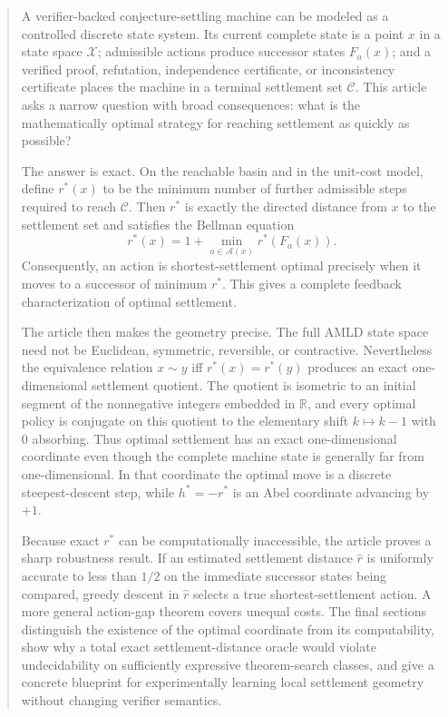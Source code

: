 \documentclass[11pt,letterpaper]{article}
\theoremstyle{remark}
\newcommand{\X}{\mathcal X}
\newcommand{\Cset}{\mathcal C}
\newcommand{\A}{\mathcal A}
\newcommand{\R}{\mathbb R}
\newcommand{\rstar}{r^{\!*}}
\newcommand{\rhat}{\widehat r}
\begin{document}
\begin{abstract}
A verifier-backed conjecture-settling machine can be modeled as a controlled discrete state system. Its current complete state is a point $x$ in a state space $\X$; admissible actions produce successor states $F_a(x)$; and a verified proof, refutation, independence certificate, or inconsistency certificate places the machine in a terminal settlement set $\Cset$. This article asks a narrow question with broad consequences: what is the mathematically optimal strategy for reaching settlement as quickly as possible?

The answer is exact. On the reachable basin and in the unit-cost model, define $\rstar(x)$ to be the minimum number of further admissible steps required to reach $\Cset$. Then $\rstar$ is exactly the directed distance from $x$ to the settlement set and satisfies the Bellman equation
\[
\rstar(x)=1+\min_{a\in\A(x)}\rstar(F_a(x)).
\]
Consequently, an action is shortest-settlement optimal precisely when it moves to a successor of minimum $\rstar$. This gives a complete feedback characterization of optimal settlement.

The article then makes the geometry precise. The full AMLD state space need not be Euclidean, symmetric, reversible, or contractive. Nevertheless the equivalence relation $x\sim y$ iff $\rstar(x)=\rstar(y)$ produces an exact one-dimensional settlement quotient. The quotient is isometric to an initial segment of the nonnegative integers embedded in $\R$, and every optimal policy is conjugate on this quotient to the elementary shift $k\mapsto k-1$ with $0$ absorbing. Thus optimal settlement has an exact one-dimensional coordinate even though the complete machine state is generally far from one-dimensional. In that coordinate the optimal move is a discrete steepest-descent step, while $h^*=-\rstar$ is an Abel coordinate advancing by $+1$.

Because exact $\rstar$ can be computationally inaccessible, the article proves a sharp robustness result. If an estimated settlement distance $\rhat$ is uniformly accurate to less than $1/2$ on the immediate successor states being compared, greedy descent in $\rhat$ selects a true shortest-settlement action. A more general action-gap theorem covers unequal costs. The final sections distinguish the existence of the optimal coordinate from its computability, show why a total exact settlement-distance oracle would violate undecidability on sufficiently expressive theorem-search classes, and give a concrete blueprint for experimentally learning local settlement geometry without changing verifier semantics.
\end{abstract}
\end{document}
